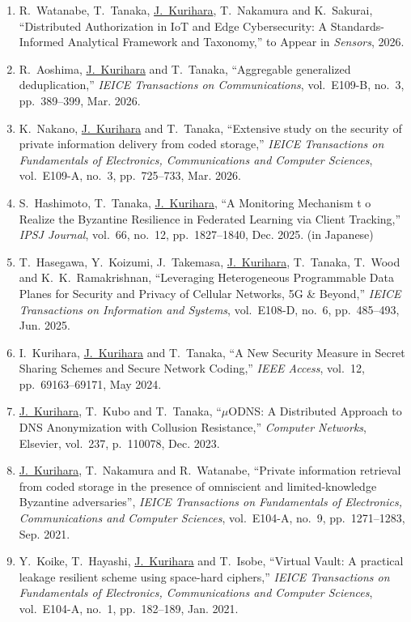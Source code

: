 \begin{enumerate}
  \item R.~Watanabe, T.~Tanaka, \underline{J.~Kurihara}, T.~Nakamura and K.~Sakurai, ``Distributed Authorization in IoT and Edge Cybersecurity: A Standards-Informed Analytical Framework and Taxonomy,'' to Appear in \textit{Sensors}, 2026.
  \item R.~Aoshima, \underline{J.~Kurihara} and T.~Tanaka, ``Aggregable generalized deduplication,'' \textit{IEICE Transactions on Communications}, vol.~E109-B, no.~3, pp.~389--399, Mar. 2026.
  \item K.~Nakano, \underline{J.~Kurihara} and T.~Tanaka, ``Extensive study on the security of private information delivery from coded storage,'' \textit{IEICE Transactions on Fundamentals of Electronics, Communications and Computer Sciences}, vol.~E109-A, no.~3, pp.~725--733, Mar. 2026.
  \item S.~Hashimoto, T.~Tanaka, \underline{J.~Kurihara}, ``A Monitoring Mechanism t o Realize the Byzantine Resilience in Federated Learning via Client Tracking,'' \textit{IPSJ Journal}, vol.~66, no.~12, pp.~1827--1840, Dec. 2025. (in Japanese)
  \item T.~Hasegawa, Y.~Koizumi, J.~Takemasa, \underline{J.~Kurihara}, T.~Tanaka, T.~Wood and K.~K.~Ramakrishnan, ``Leveraging Heterogeneous Programmable Data Planes for Security and Privacy of Cellular Networks, 5G \& Beyond,'' \textit{IEICE Transactions on Information and Systems}, vol.~E108-D, no.~6, pp.~485--493, Jun. 2025.
  \item I.~Kurihara, \underline{J.~Kurihara} and T.~Tanaka, ``A New Security Measure in Secret Sharing Schemes and Secure Network Coding,'' \textit{IEEE Access}, vol.~12, pp.~69163--69171, May 2024.
  \item \underline{J.~Kurihara}, T.~Kubo and T.~Tanaka, ``$\mu$ODNS: A Distributed Approach to DNS Anonymization with Collusion Resistance,'' \textit{Computer Networks}, Elsevier, vol.~237, p.~110078, Dec. 2023.
  \item \underline{J.~Kurihara}, T.~Nakamura and R.~Watanabe, ``Private information retrieval from coded storage in the presence of omniscient and limited-knowledge Byzantine adversaries'', \textit{IEICE Transactions on Fundamentals of Electronics, Communications and Computer Sciences}, vol.~E104-A, no.~9, pp.~1271--1283, Sep. 2021.
  \item Y.~Koike, T.~Hayashi, \underline{J.~Kurihara} and T.~Isobe, ``Virtual Vault: A practical leakage resilient scheme using space-hard ciphers,'' \textit{IEICE Transactions on Fundamentals of Electronics, Communications and Computer Sciences}, vol.~E104-A, no.~1, pp.~182--189, Jan. 2021.

\end{enumerate}
